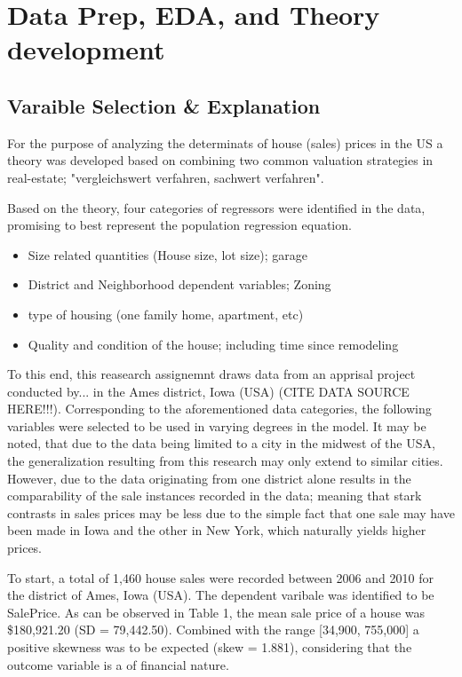 \documentclass{article}
\begin{document}
\section{Data Prep, EDA, and Theory development}
\subsection{Varaible Selection \& Explanation}
\indent For the purpose of analyzing the determinats of house (sales) prices in the US a theory was developed based on combining two common valuation strategies in real-estate; "vergleichswert verfahren, sachwert verfahren".

\indent Based on the theory, four categories of regressors were identified in the data, promising to best represent the population regression equation. 
\begin{itemize}
  \item Size related quantities (House size, lot size); garage
  \item District and Neighborhood dependent variables; Zoning
  \item type of housing (one family home, apartment, etc)
  \item Quality and condition of the house; including time since remodeling
\end{itemize}

To this end, this reasearch assignemnt draws data from an apprisal project conducted by... in the Ames district, Iowa (USA) (CITE DATA SOURCE HERE!!!). Corresponding to the aforementioned data categories, the following variables were selected to be used in varying degrees in the model. It may be noted, that due to the data being limited to a city in the midwest of the USA, the generalization resulting from this research may only extend to similar cities. However, due to the data originating from one district alone results in the comparability of the sale instances recorded in the data; meaning that stark contrasts in sales prices may be less due to the simple fact that one sale may have been made in Iowa and the other in New York, which naturally yields higher prices.

To start, a total of 1,460 house sales were recorded between 2006 and 2010 for the district of Ames, Iowa (USA). The dependent varibale was identified to be SalePrice. As can be observed in Table 1, the mean sale price of a house was \$180,921.20 (SD = 79,442.50). Combined with the range [34,900, 755,000] a positive skewness was to be expected (skew = 1.881), considering that the outcome variable is a of financial nature.
\end{document}
